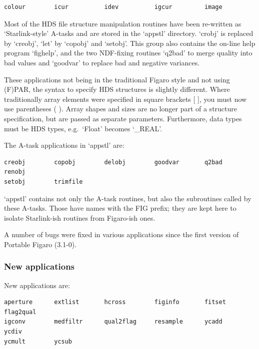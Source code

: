 \begin{verbatim}
colour        icur          idev          igcur         image
\end{verbatim}

   Most of the HDS file structure manipulation routines have been
   re-written as `Starlink-style' A-tasks and are stored in the `appstl'
   directory. `crobj' is replaced by `creobj', `let' by `copobj' and
   `setobj'.  This group also contains the on-line help program
   `fighelp', and the two NDF-fixing routines `q2bad' to merge quality
   into bad values and `goodvar' to replace bad and negative variances.

   These applications not being in the traditional Figaro style and not
   using (F)PAR, the syntax to specify HDS structures is slightly
   different.  Where traditionally array elements
   were specified in square brackets [ ], you must now use parentheses
   ( ). Array shapes and sizes are no longer part of a structure
   specification, but are passed as separate parameters.  Furthermore,
   data types must be HDS types, e.g.\ `Float' becomes `\_REAL'.

   The A-task applications in `appstl' are:

\begin{verbatim}
creobj        copobj        delobj        goodvar       q2bad         renobj
setobj        trimfile
\end{verbatim}

   `appstl' contains not only the A-task routines, but also the
   subroutines called by these A-tasks. Those have names with the FIG
   prefix; they are kept here to isolate Starlink-ish routines from
   Figaro-ish ones.

   A number of bugs were fixed in various applications since the first
   version of Portable Figaro (3.1-0).


\subsubsection{\label{changessub3a}New applications}

   New applications are:

\begin{verbatim}
aperture      extlist       hcross        figinfo       fitset        flag2qual
igconv        medfiltr      qual2flag     resample      ycadd         ycdiv
ycmult        ycsub
\end{verbatim}

